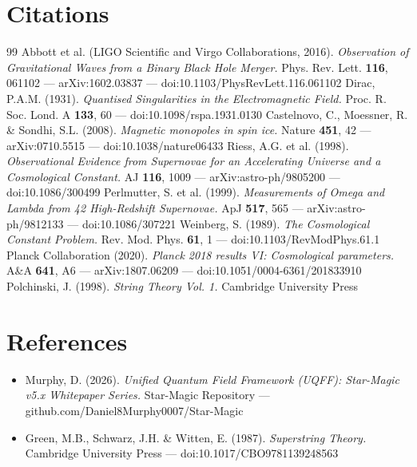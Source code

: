 \documentclass[12pt,a4paper]{article}
\begin{document}
\section*{Citations}
\begin{thebibliography}{99}
 Abbott et al. (LIGO Scientific and Virgo Collaborations, 2016). \emph{Observation of Gravitational Waves from a Binary Black Hole Merger.} Phys. Rev. Lett. \textbf{116}, 061102 --- arXiv:1602.03837 --- doi:10.1103/PhysRevLett.116.061102
 Dirac, P.A.M. (1931). \emph{Quantised Singularities in the Electromagnetic Field.} Proc. R. Soc. Lond. A \textbf{133}, 60 --- doi:10.1098/rspa.1931.0130
 Castelnovo, C., Moessner, R. \& Sondhi, S.L. (2008). \emph{Magnetic monopoles in spin ice.} Nature \textbf{451}, 42 --- arXiv:0710.5515 --- doi:10.1038/nature06433
 Riess, A.G. et al. (1998). \emph{Observational Evidence from Supernovae for an Accelerating Universe and a Cosmological Constant.} AJ \textbf{116}, 1009 --- arXiv:astro-ph/9805200 --- doi:10.1086/300499
 Perlmutter, S. et al. (1999). \emph{Measurements of Omega and Lambda from 42 High-Redshift Supernovae.} ApJ \textbf{517}, 565 --- arXiv:astro-ph/9812133 --- doi:10.1086/307221
 Weinberg, S. (1989). \emph{The Cosmological Constant Problem.} Rev. Mod. Phys. \textbf{61}, 1 --- doi:10.1103/RevModPhys.61.1
 Planck Collaboration (2020). \emph{Planck 2018 results VI: Cosmological parameters.} A\&A \textbf{641}, A6 --- arXiv:1807.06209 --- doi:10.1051/0004-6361/201833910
 Polchinski, J. (1998). \emph{String Theory Vol. 1.} Cambridge University Press
\end{thebibliography}

\section*{References}
\begin{itemize}
  \item[2.] Murphy, D. (2026). \emph{Unified Quantum Field Framework (UQFF): Star-Magic v5.x Whitepaper Series.} Star-Magic Repository --- github.com/Daniel8Murphy0007/Star-Magic
  \item[9.] Green, M.B., Schwarz, J.H. \& Witten, E. (1987). \emph{Superstring Theory.} Cambridge University Press --- doi:10.1017/CBO9781139248563
\end{itemize}

\end{document}
